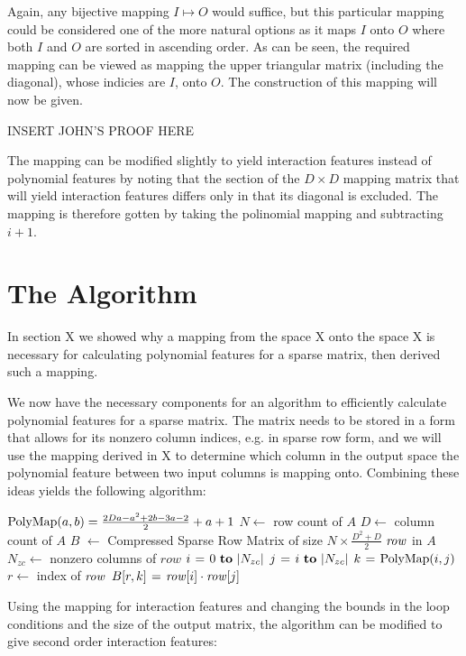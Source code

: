 \documentclass[11pt,twocolumn]{article}
\begin{document}
Again, any bijective mapping $I \mapsto O$ would suffice, but this particular mapping could
be considered one of the more natural options as it maps $I$ onto $O$ where both $I$ and $O$ are sorted in ascending order.
As can be seen, the required mapping can be viewed as mapping the upper triangular matrix (including 
the diagonal), whose indicies are $I$, onto $O$. The construction of this mapping will now
be given.

INSERT JOHN'S PROOF HERE

The mapping can be modified slightly to yield interaction features instead of polynomial features
by noting that the section of the $D \times D$ mapping matrix that will yield interaction
features differs only in that its diagonal is excluded. The mapping is therefore gotten by
taking the polinomial mapping and subtracting $i+1$.


\section{The Algorithm}
In section X we showed why a mapping from the space X
onto the space X is necessary for calculating polynomial features for a sparse matrix, then
derived such a mapping.

We now have the necessary components for an algorithm to efficiently calculate polynomial features for
a sparse matrix. The matrix needs to be stored in a form that allows for its nonzero column indices, e.g. in sparse row form,
and we will use the mapping derived in X to determine which column in the output space
the polynomial feature between two input columns is mapping onto. Combining these ideas yields the following algorithm:

\begin{codebox}
    \zi $\func{PolyMap}(a, b) = \frac{2Da-a^2+2b-3a-2}{2}+a+1$
    \zi $N \gets$ row count of $A$
    \zi $D \gets$ column count of $A$
    \zi $B$ $\gets$ Compressed Sparse Row Matrix of size $N \times \frac{D^2+D}{2}$
    \zi \For $\id{row}$ in $A$ \Do
    \zi     $N_{zc} \gets$ nonzero columns of $row$
    \zi     \For $i \gets 0 \To |N_{zc}|$ \Do
    \zi         \For $j \gets i \To |N_{zc}|$ \Do
    \zi             $k \gets \func{PolyMap}(i, j)$
    \zi             $r \gets$ index of $\id{row}$
    \zi             $B[r, k] \gets \id{row}[i] \cdot \id{row}[j]$
                \End
            \End
       	\End
\end{codebox}

Using the mapping for interaction features and changing the bounds in the loop conditions and the size of the output matrix, 
the algorithm can be modified to give second order interaction features:
\end{document}
